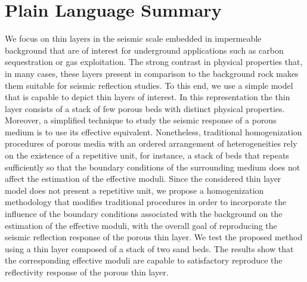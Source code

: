 \documentclass[draft]{agujournal2019}
\begin{document}
\section*{Plain Language Summary}
We focus on thin layers in the seismic scale embedded in impermeable background that are of interest for underground applications such as carbon sequestration or gas exploitation. The strong contrast in physical properties that, in many cases, these layers present in comparison to the background rock makes them suitable for seismic reflection studies. To this end, we use a simple model that is capable to depict thin layers of interest. In this representation the thin layer consists of a stack of few porous beds with distinct physical properties. Moreover, a simplified technique to study the seismic response of a porous medium is to use its effective equivalent. Nonetheless, traditional homogenization procedures of porous media with an ordered arrangement of heterogeneities rely on the existence of a repetitive unit, for instance, a stack of beds that repeats sufficiently so that the boundary conditions of the surrounding medium does not affect the estimation of the effective moduli. Since the considered thin layer model does not present a repetitive unit, we propose a homogenization methodology that modifies traditional procedures in order to incorporate the influence of the boundary conditions associated with the background on the estimation of the effective moduli, with the overall goal of reproducing the seismic reflection response of the porous thin layer. We test the proposed method using a thin layer composed of a stack of two sand beds. The results show that the corresponding effective moduli are capable to satisfactory reproduce the reflectivity response of the porous thin layer.

%
%

%

\end{document}
